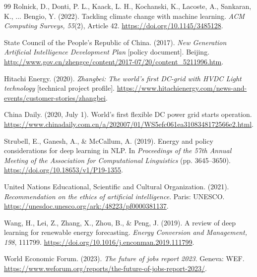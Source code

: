 \documentclass[12pt]{article}
\begin{document}
\begin{thebibliography}{99}
Rolnick, D., Donti, P. L., Kaack, L. H., Kochanski, K., Lacoste, A., Sankaran, K., ... Bengio, Y. (2022). Tackling climate change with machine learning. \textit{ACM Computing Surveys, 55}(2), Article 42. \url{https://doi.org/10.1145/3485128}.

State Council of the People's Republic of China. (2017). \textit{New Generation Artificial Intelligence Development Plan} [policy document]. Beijing. \url{http://www.gov.cn/zhengce/content/2017-07/20/content_5211996.htm}.

Hitachi Energy. (2020). \textit{Zhangbei: The world's first DC-grid with HVDC Light technology} [technical project profile]. \url{https://www.hitachienergy.com/news-and-events/customer-stories/zhangbei}.

China Daily. (2020, July 1). World's first flexible DC power grid starts operation. \url{https://www.chinadaily.com.cn/a/202007/01/WS5efc061ea3108348172566e2.html}.

Strubell, E., Ganesh, A., \& McCallum, A. (2019). Energy and policy considerations for deep learning in NLP. In \textit{Proceedings of the 57th Annual Meeting of the Association for Computational Linguistics} (pp. 3645--3650). \url{https://doi.org/10.18653/v1/P19-1355}.

United Nations Educational, Scientific and Cultural Organization. (2021). \textit{Recommendation on the ethics of artificial intelligence}. Paris: UNESCO. \url{https://unesdoc.unesco.org/ark:/48223/pf0000381137}.

Wang, H., Lei, Z., Zhang, X., Zhou, B., \& Peng, J. (2019). A review of deep learning for renewable energy forecasting. \textit{Energy Conversion and Management, 198}, 111799. \url{https://doi.org/10.1016/j.enconman.2019.111799}.

World Economic Forum. (2023). \textit{The future of jobs report 2023}. Geneva: WEF. \url{https://www.weforum.org/reports/the-future-of-jobs-report-2023/}.

\end{thebibliography}
\end{document}
